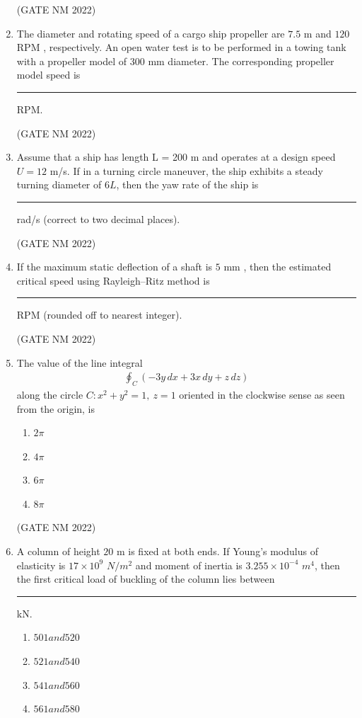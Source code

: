 \documentclass[journal,12pt,onecolumn]{IEEEtran}
\theoremstyle{remark}
\begin{document}
\begin{enumerate}
\hfill(GATE NM 2022)

\item  The diameter and rotating speed of a cargo ship propeller are $7.5$ m  and $120$ RPM , respectively.  
An open water test is to be performed in a towing tank with a propeller model of $300$ mm  diameter.  
The corresponding propeller model speed is \rule{3cm}{0.15mm} RPM.

\hfill(GATE NM 2022)

\item  Assume that a ship has length L = 200 m  and operates at a design speed $U = 12$ m/s.  
	If in a turning circle maneuver, the ship exhibits a steady turning diameter of $6L$, then the yaw rate of the ship is \rule{3cm}{0.15mm} rad/s (correct to two decimal places).

\hfill(GATE NM 2022)

\item If the maximum static deflection of a shaft is $5$ mm , then the estimated critical speed using Rayleigh--Ritz method is \rule{3cm}{0.15mm} RPM  (rounded off to nearest integer).

	\hfill(GATE NM 2022)

\item  The value of the line integral  
\begin{align*}
\oint_C \!\left( -3y \, dx + 3x \, dy + z \, dz \right)
\end{align*}
along the circle $C: x^2 + y^2 = 1, \ z = 1$ oriented in the clockwise sense as seen from the origin, is
\begin{multicols}{4}
\begin{enumerate}
    \item $2\pi$
    \item $4\pi$
    \item $6\pi$
    \item $8\pi$
\end{enumerate}
\end{multicols}

\hfill(GATE NM 2022)

\item  A column of height $20$ m  is fixed at both ends.  
	If Young's modulus of elasticity is $17 \times 10^{9}$ $ N/m^2 $ and moment of inertia is $3.255 \times  10^{-4}$ $ m^4 $, then the first critical load of buckling of the column lies between \rule{3cm}{0.15mm} kN.
\begin{multicols}{4}
\begin{enumerate}
    \item $501 and 520$
    \item $521 and 540$
    \item $541 and 560$
    \item $561 and 580$
\end{enumerate}
\end{multicols}


\end{enumerate}
\end{document}
